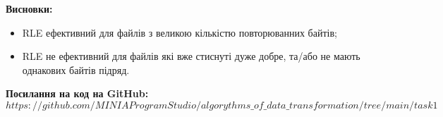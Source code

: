 \documentclass{article}
\def\code#1{\texttt{#1}}
\begin{document}
\textbf{Висновки:}
\begin{itemize}
\item RLE ефективний для файлів з великою кількістю повторюванних байтів;
\item RLE не ефективний для файлів які вже стиснуті дуже добре, та/або не мають однакових байтів підряд.
\end{itemize}

\textbf{Посилання на код на GitHub:}\\
\code{$https://github.com/MINIAProgramStudio/algorythms\_of\_data\_transformation/tree/main/task1$}
\end{document}
